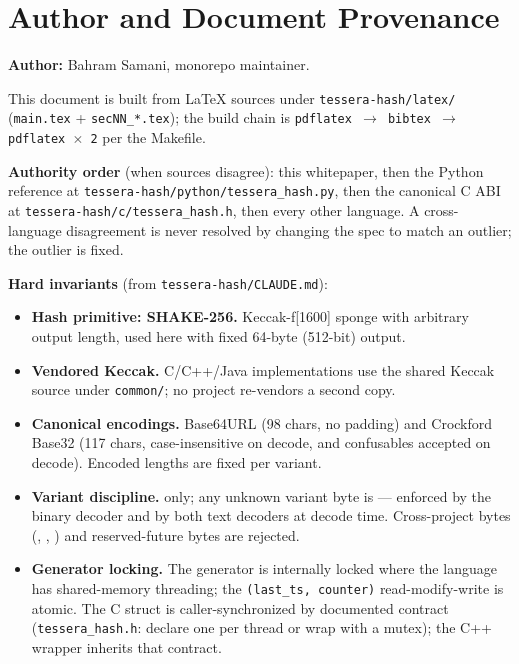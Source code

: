 \section{Author and Document Provenance}
\label{sec:appendix-provenance}

\textbf{Author:} Bahram Samani, \tessera{} monorepo maintainer.

This document is built from LaTeX sources under \texttt{tessera-hash/latex/} (\texttt{main.tex} + \texttt{secNN\_*.tex}); the build chain is \texttt{pdflatex $\rightarrow$ bibtex $\rightarrow$ pdflatex $\times$ 2} per the Makefile.

\textbf{Authority order} (when sources disagree): this whitepaper, then the Python reference at \texttt{tessera-hash/python/tessera\_hash.py}, then the canonical C ABI at \texttt{tessera-hash/c/tessera\_hash.h}, then every other language. A cross-language disagreement is never resolved by changing the spec to match an outlier; the outlier is fixed.

\textbf{Hard invariants} (from \texttt{tessera-hash/CLAUDE.md}):

\begin{itemize}
\item \textbf{Hash primitive: SHAKE-256.} Keccak-f[1600] sponge with arbitrary output length, used here with fixed 64-byte (512-bit) output.
\item \textbf{Vendored Keccak.} C/C++/Java implementations use the shared Keccak source under \texttt{common/}; no project re-vendors a second copy.
\item \textbf{Canonical encodings.} Base64URL (98 chars, no padding) and Crockford Base32 (117 chars, case-insensitive on decode,  and  confusables accepted on decode). Encoded lengths are fixed per variant.
\item \textbf{Variant discipline.}  only; any unknown variant byte is  --- enforced by the binary decoder and by both text decoders at decode time. Cross-project bytes (, , ) and reserved-future bytes are rejected.
\item \textbf{Generator locking.} The generator is internally locked where the language has shared-memory threading; the \texttt{(last\_ts, counter)} read-modify-write is atomic. The C struct is caller-synchronized by documented contract (\texttt{tessera\_hash.h}: declare one per thread or wrap with a mutex); the C++ wrapper inherits that contract.
\end{itemize}

